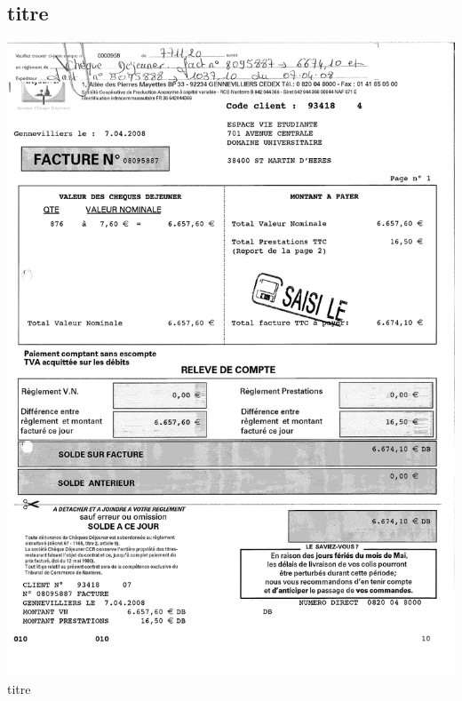 \subsection{titre}
\begin{center}
\includegraphics[scale=0.6]{annexes/images/chequedejeuner_facture.pdf} \\
titre
\end{center}

